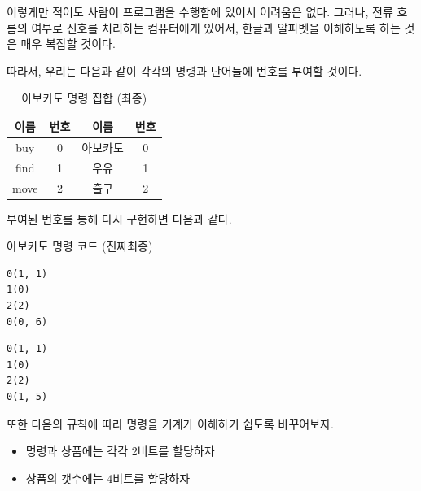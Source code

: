 \documentclass[a4paper,12pt]{book}
\begin{document}
이렇게만 적어도 사람이 프로그램을 수행함에 있어서 어려움은 없다.
그러나, 전류 흐름의 여부로 신호를 처리하는 컴퓨터에게 있어서,
한글과 알파벳을 이해하도록 하는 것은 매우 복잡할 것이다.

따라서, 우리는 다음과 같이 각각의 명령과 단어들에 번호를 부여할 것이다.

\begin{table}[!h]
    \centering

    \caption{아보카도 명령 집합 (최종)}
    \label{Tab:avocado-isa-int}

    \begin{tabular}{ || c | c | c | c || }
        \hline
        이름 & 번호 & 이름     & 번호 \\
        \hline\hline
        buy  & 0    & 아보카도 & 0    \\
        \hline
        find & 1    & 우유     & 1    \\
        \hline
        move & 2    & 출구     & 2    \\
        \hline
    \end{tabular}
\end{table}

부여된 번호를 통해 다시 구현하면 다음과 같다.

\begin{center}

    \centering

    아보카도 명령 코드 (진짜최종)

    \begin{minipage}{0.45\textwidth}
        \begin{lstlisting}
0(1, 1)
1(0)
2(2)
0(0, 6)
        \end{lstlisting}
    \end{minipage}
    \hfill
    \begin{minipage}{0.45\textwidth}
        \begin{lstlisting}
0(1, 1)
1(0)
2(2)
0(1, 5)
        \end{lstlisting}
    \end{minipage}

\end{center}

또한 다음의 규칙에 따라 명령을 기계가 이해하기 쉽도록 바꾸어보자.

\begin{itemize}
    \item 명령과 상품에는 각각 2비트를 할당하자
    \item 상품의 갯수에는 4비트를 할당하자
\end{itemize}
\end{document}
